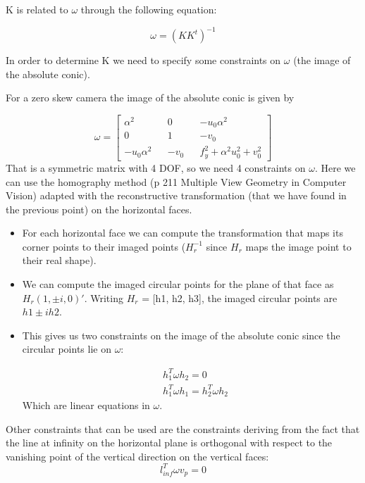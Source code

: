 \documentclass[11pt, oneside]{article}   	%
\begin{document}
K is related to $\omega$ through the following equation:

$$
\omega = (KK^t)^{-1}
$$

In order to determine K we need to specify some constraints on $\omega$ (the image of the absolute conic).

For a zero skew camera the image of the absolute conic is given by

\begin{equation} \label{omegaeq}
\omega = 
\begin{bmatrix}
\alpha^2 && 0 && -u_0 \alpha^2 \\ 0 && 1 && -v_0 \\  -u_0 \alpha^2 && -v_0 && f_y^2 +\alpha^2 u_0^2 + v_0^2
\end{bmatrix}
\end{equation}
That is a symmetric matrix with 4 DOF, so we need 4 constraints on $\omega$.
Here we can use the homography method (p 211 Multiple View Geometry in Computer Vision) adapted with the reconstructive transformation (that we have found in the previous point) on the horizontal faces.

\begin{itemize}
\item For each horizontal face we can compute the transformation that maps its corner points to their imaged points ($H_r^{-1}$ since $H_r$ maps the image point to their real shape).
\item We can compute the imaged circular points for the plane of that face as $H_r(1,\pm i, 0)'$. Writing $H_r$ = [h1, h2, h3], the imaged circular points are $h1 \pm ih2 $.
\item This gives us two constraints on the image of the absolute conic since the circular points lie on $\omega$:

   \begin{subequations}
   \begin{align*}
   & h_1^T\omega h_2= 0 \\ 
   & h_1^T\omega h_1= h_2^T\omega h_2 
   \end{align*}
   \end{subequations}
   Which are linear equations in $\omega$.

\end{itemize}
Other constraints that can be used are the constraints deriving from the fact that the line at infinity on the horizontal plane is orthogonal with respect to the vanishing point of the vertical direction on the vertical faces:
$$
l_{inf}^T\omega v_p = 0
$$
\end{document}
